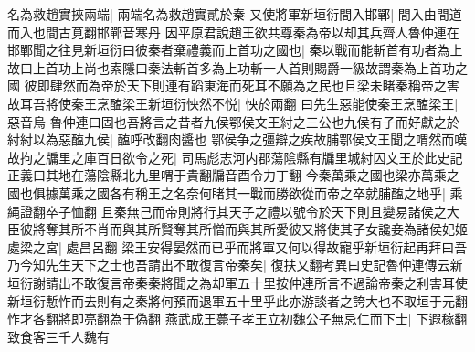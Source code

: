 名為救趙實挾兩端|{
	兩端名為救趙實貳於秦}
又使將軍新垣衍間入邯鄲|{
	間入由間道而入也間古莧翻邯鄲音寒丹}
因平原君說趙王欲共尊秦為帝以却其兵齊人魯仲連在邯鄲聞之往見新垣衍曰彼秦者棄禮義而上首功之國也|{
	秦以戰而能斬首有功者為上故曰上首功上尚也索隱曰秦法斬首多為上功斬一人首則賜爵一級故謂秦為上首功之國}
彼即肆然而為帝於天下則連有蹈東海而死耳不願為之民也且梁未睹秦稱帝之害故耳吾將使秦王烹醢梁王新垣衍怏然不悦|{
	怏於兩翻}
曰先生惡能使秦王烹醢梁王|{
	惡音烏}
魯仲連曰固也吾將言之昔者九侯鄂侯文王紂之三公也九侯有子而好獻之於紂紂以為惡醢九侯|{
	醢呼改翻肉醬也}
鄂侯争之彊辯之疾故脯鄂侯文王聞之喟然而嘆故拘之牖里之庫百日欲令之死|{
	司馬彪志河内郡蕩隂縣有牖里城紂囚文王於此史記正義曰其地在蕩陰縣北九里喟于貴翻牖音酉令力丁翻}
今秦萬乘之國也梁亦萬乘之國也俱據萬乘之國各有稱王之名奈何睹其一戰而勝欲從而帝之卒就脯醢之地乎|{
	乘䋲證翻卒子恤翻}
且秦無己而帝則將行其天子之禮以號令於天下則且變易諸侯之大臣彼將奪其所不肖而與其所賢奪其所憎而與其所愛彼又將使其子女讒妾為諸侯妃姬處梁之宮|{
	處昌呂翻}
梁王安得晏然而已乎而將軍又何以得故寵乎新垣衍起再拜曰吾乃今知先生天下之士也吾請出不敢復言帝秦矣|{
	復扶又翻考異曰史記魯仲連傳云新垣衍謝請出不敢復言帝秦秦將聞之為却軍五十里按仲連所言不過論帝秦之利害耳使新垣衍慙怍而去則有之秦將何預而退軍五十里乎此亦游談者之誇大也不取垣于元翻怍才各翻將即亮翻為于偽翻}
燕武成王薨子孝王立初魏公子無忌仁而下士|{
	下遐稼翻}
致食客三千人魏有

